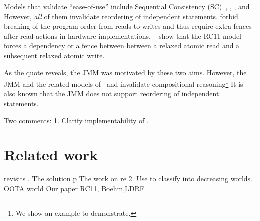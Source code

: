 Models that validate ``ease-of-use'' include Sequential Consistency (SC)~\citet{Lamport:1979:MMC:1311099.1311750}, \citet{Dolan:2018:BDR:3192366.3192421}, \citet{DBLP:conf/pldi/LahavVKHD17}, \citet{DBLP:conf/lics/JeffreyR16} and~\citet{BoehmOOTA}.  However, {\em all} of them invalidate reordering of independent statements.  \cite{Dolan:2018:BDR:3192366.3192421,BoehmOOTA,DBLP:conf/lics/JeffreyR16} forbid breaking of the program order from reads to writes and thus require extra fences after read actions in hardware implementations.  ~\citet{Boehm:2014:OGA:2618128.2618134} show that the RC11 model\cite{DBLP:conf/pldi/LahavVKHD17} forces a dependency or a fence between between a relaxed atomic
read and a subsequent relaxed atomic write.  


As the quote reveals, the JMM\citet{Manson:2005:JMM:1047659.1040336} was motivated by these two aims.  However, the JMM and the related models of~\citet{DBLP:conf/esop/JagadeesanPR10} and \citet{DBLP:conf/popl/KangHLVD17} invalidate compositional reasoning\footnote{We show an example to demonstrate.} It is also known that the JMM does not support reordering of independent statements.  

Two comments:
1. Clarify implementability of \citet{DBLP:conf/lics/JeffreyR16}.

\section{Related work}

\citet{BoehmOOTA} revisits \oota.  The solution p
The work on re
2. Use\cite{BoehmOOTA} to 
classify into decreasing worlds.
           OOTA world
              Our paper
                 RC11, Boehm,LDRF






